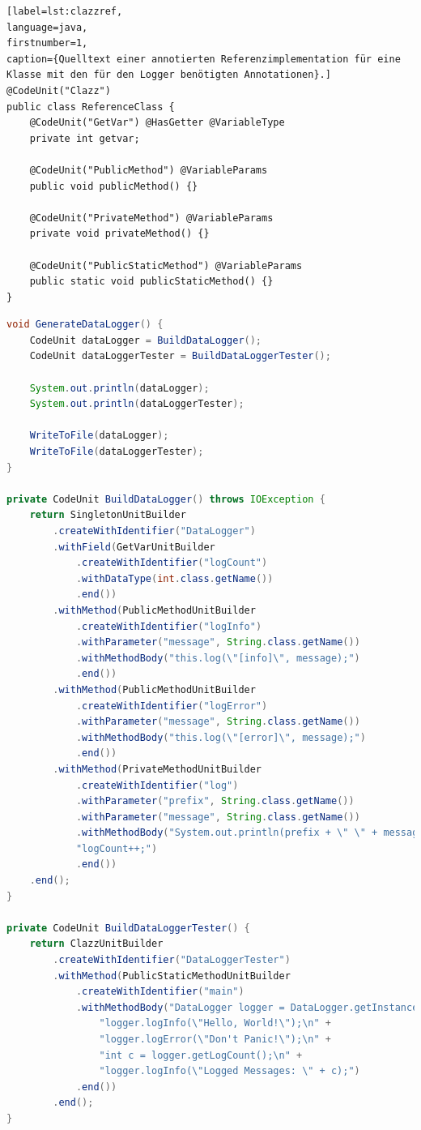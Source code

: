 \documentclass[12pt,oneside,a4paper,parskip]{scrbook}
\begin{document}
\begin{lstlisting}[label=lst:clazzref,
language=java,
firstnumber=1,
caption={Quelltext einer annotierten Referenzimplementation für eine Klasse mit den für den Logger benötigten Annotationen}.]
@CodeUnit("Clazz")
public class ReferenceClass {
	@CodeUnit("GetVar") @HasGetter @VariableType
	private int getvar;
	
	@CodeUnit("PublicMethod") @VariableParams
	public void publicMethod() {}
	
	@CodeUnit("PrivateMethod") @VariableParams
	private void privateMethod() {}
	
	@CodeUnit("PublicStaticMethod") @VariableParams
	public static void publicStaticMethod() {}
}
\end{lstlisting}

\begin{lstlisting}[label=lst:dataloggergen,
				   language=java,
				   firstnumber=1,
				   caption=Quelltext zur Erzeugung des DataLoggers und des zugehörigen Testers.]
void GenerateDataLogger() {
	CodeUnit dataLogger = BuildDataLogger();
	CodeUnit dataLoggerTester = BuildDataLoggerTester();
	
	System.out.println(dataLogger);
	System.out.println(dataLoggerTester);
	
	WriteToFile(dataLogger);
	WriteToFile(dataLoggerTester);
}

private CodeUnit BuildDataLogger() throws IOException {
	return SingletonUnitBuilder
		.createWithIdentifier("DataLogger")
		.withField(GetVarUnitBuilder
			.createWithIdentifier("logCount")
			.withDataType(int.class.getName())
			.end())
		.withMethod(PublicMethodUnitBuilder
			.createWithIdentifier("logInfo")
			.withParameter("message", String.class.getName())
			.withMethodBody("this.log(\"[info]\", message);")
			.end())
		.withMethod(PublicMethodUnitBuilder
			.createWithIdentifier("logError")
			.withParameter("message", String.class.getName())
			.withMethodBody("this.log(\"[error]\", message);")
			.end())
		.withMethod(PrivateMethodUnitBuilder
			.createWithIdentifier("log")
			.withParameter("prefix", String.class.getName())
			.withParameter("message", String.class.getName())
			.withMethodBody("System.out.println(prefix + \" \" + message);\n" +
			"logCount++;")
			.end())
	.end();
}

private CodeUnit BuildDataLoggerTester() {
	return ClazzUnitBuilder
		.createWithIdentifier("DataLoggerTester")
		.withMethod(PublicStaticMethodUnitBuilder
			.createWithIdentifier("main")
			.withMethodBody("DataLogger logger = DataLogger.getInstance();\n" +
				"logger.logInfo(\"Hello, World!\");\n" +
				"logger.logError(\"Don't Panic!\");\n" +
				"int c = logger.getLogCount();\n" +
				"logger.logInfo(\"Logged Messages: \" + c);")
			.end())
		.end();
}


\end{lstlisting}
\end{document}
